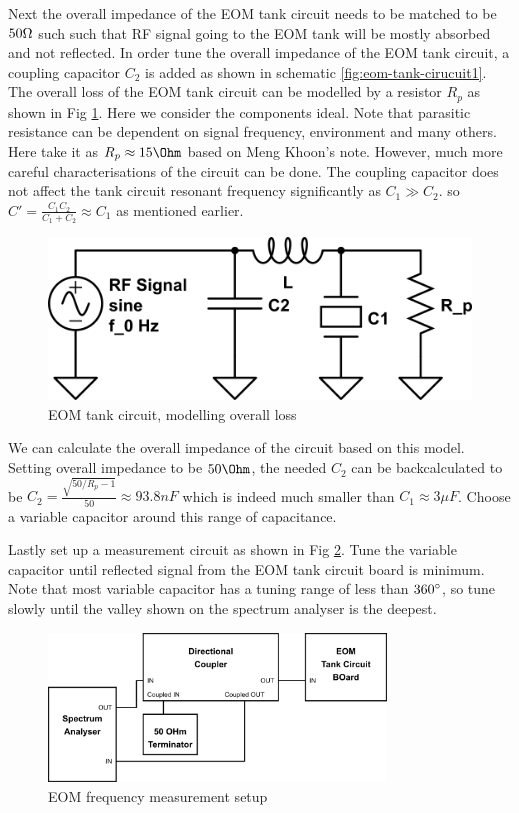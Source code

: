 \documentclass[12pt]{report}
\begin{document}
\par
Next the overall impedance of the EOM tank circuit needs to be matched to be $50\ohm$ such such that RF signal going to the EOM tank will be mostly absorbed and not reflected. In order tune the overall impedance of the EOM tank circuit, a coupling capacitor $C_2$ is added as shown in schematic \ref{fig:eom-tank-cirucuit1}. The overall loss of the EOM tank circuit can be modelled by a resistor $R_p$ as shown in Fig \ref{fig:eom-tank-cirucuit2}. Here we consider the components ideal. Note that parasitic resistance can be dependent on signal frequency, environment and many others. Here take it as $ R_p \approx 15 \Ohm$ based on Meng Khoon's note. However, much more careful characterisations of the circuit can be done. The coupling capacitor does not affect the tank circuit resonant frequency significantly as $C_1 \gg C_2$. so $C' = \frac{C_1C_2}{C_1+C_2} \approx C_1$ as mentioned earlier.  

\begin{figure}[H]
    \centering
    \includegraphics[width=.8\textwidth]{eom-tank-cirucuit2.png}
    \caption{EOM tank circuit, modelling overall loss}
    \label{fig:eom-tank-cirucuit2}
\end{figure}

We can calculate the overall impedance of the circuit based on this model. Setting overall impedance to be $50\Ohm$, the needed $C_2$ can be backcalculated to be $C_2 = \frac{\sqrt{50/R_p -1}}{50} \approx 93.8 nF$ which is indeed much smaller than $C_1 \approx 3 \mu F$. Choose a variable capacitor around this range of capacitance. 
\par
Lastly set up a measurement circuit as shown in Fig \ref{fig:eom-freq-measurement-setup.png}. Tune the variable capacitor until reflected signal from the EOM tank circuit board is minimum. Note that most variable capacitor has a tuning range of less than $360\degree$, so tune slowly until the valley shown on the spectrum analyser is the deepest. 

\begin{figure}[H]
    \centering
    \includegraphics[width=0.8\textwidth]{eom-freq-measurement-setup.png}
    \caption{EOM frequency measurement setup}
    \label{fig:eom-freq-measurement-setup.png}
\end{figure}
\end{document}
